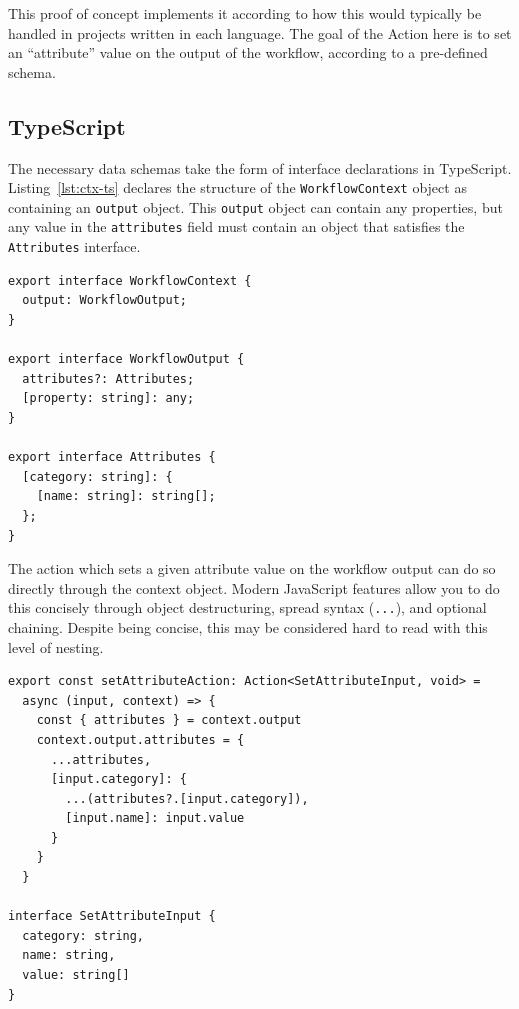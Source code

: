 This proof of concept implements it according to how this would typically be handled in projects written in each language. The goal of the Action here is to set an ``attribute'' value on the output of the workflow, according to a pre-defined schema. 

\subsection{TypeScript}
The necessary data schemas take the form of interface declarations in TypeScript. Listing~\ref{lst:ctx-ts} declares the structure of the \texttt{WorkflowContext} object as containing an \texttt{output} object. This \texttt{output} object can contain any properties, but any value in the \texttt{attributes} field must contain an object that satisfies the \texttt{Attributes} interface. 
\begin{listing}[H]
\begin{verbatim}
export interface WorkflowContext {
  output: WorkflowOutput;
}

export interface WorkflowOutput {
  attributes?: Attributes;
  [property: string]: any;
}

export interface Attributes {
  [category: string]: {
    [name: string]: string[];
  };
}
\end{verbatim}
\caption{\label{lst:ctx-ts}WorkflowContext and Attributes interfaces in TypeScript}
\end{listing}

The action which sets a given attribute value on the workflow output can do so directly through the context object. Modern JavaScript features allow you to do this concisely through object destructuring, spread syntax (\texttt{...}), and optional chaining. Despite being concise, this may be considered hard to read with this level of nesting. 
\begin{listing}[H]
\begin{verbatim}
export const setAttributeAction: Action<SetAttributeInput, void> = 
  async (input, context) => {
    const { attributes } = context.output
    context.output.attributes = {
      ...attributes, 
      [input.category]: {
        ...(attributes?.[input.category]),
        [input.name]: input.value
      }
    }
  }

interface SetAttributeInput {
  category: string,
  name: string,
  value: string[]
}
\end{verbatim}
\caption{''Set attribute'' Action in TypeScript}
\end{listing}

